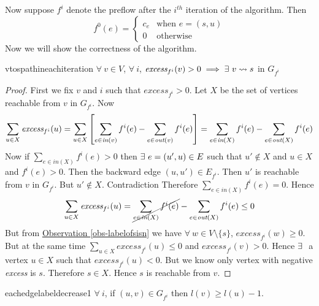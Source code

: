 Now suppose $f^i$ denote the preflow after the $i^{th}$ iteration of the algorithm. Then $$f^0(e)=\begin{cases}
	c_e&\text{when $e=(s,u)$}\\ 0 & \text{otherwise}
\end{cases}$$
Now we will show the correctness of the algorithm.
\begin{lemma}{}{vtospathineachiteration}
	$\forall\ v\in V$, $\forall\ i$, $\textit{excess}_{f^i}(v)>0\implies\exs\ v\rightsquigarrow s$ in $G_{f^i}$
\end{lemma}
\begin{proof}
	First we fix $v$ and $i$ such that $\textit{excess}_{f^i}>0$. Let $X$ be the set of vertices reachable from $v$ in $G_{f^i}$. Now 
	$$
		\sum_{u\in X}\textit{excess}_{f^i}(u) =\sum_{u\in X}\left[ \sum_{e\in \textit{in}(v)}f^i(e)-\sum_{e\in\textit{out}(v)}f^i(e) \right]= \sum_{e\in \textit{in}(X)}f^{i}(e)-\sum_{e\in\textit{out}{(X)}}f^{i}(e)$$
		Now if $\sum\limits_{e\in \textit{in}(X)}f^{i}(e)>0$ then $\exists\ e=(u',u)\in E$ such that $u'\notin X$ and $u\in X$ and $f^{i}(e)>0$. Then the backward edge $(u,u')\in E_{f^i}$. Then $u'$ is reachable from $v$ in $G_{f^i}$. But $u'\notin X$. Contradiction \ctr Therefore $\sum\limits_{e\in \textit{in}(X)}  f^{i}(e)=0$. Hence $$\sum_{u\in X}  \textit{excess}_{f^i}(u)= \cancel{\sum_{e\in \textit{in}(X)}f^{i}(e)}-\sum_{e\in\textit{out}{(X)}}f^{i}(e)\leq 0$$But from \hyperref[obs-labelofsisn]{Observation \ref{obs-labelofsisn}}  we have $\forall\ w\in V\setminus\{s\}$, $\textit{excess}_{f^i}(w)\geq 0$. But at the same time $\sum\limits_{u\in X}  \textit{excess}_{f^i}(u)\leq 0$ and $\textit{excess}_{f^i}(v)>0$. Hence $\exists\ $ a vertex $u\in X$ such that $\textit{excess}_{f^i}(u)< 0$. But we know only vertex with negative \textit{excess} is $s$. Therefore $s\in X$. Hence $s$ is reachable from $v$.
\end{proof}
\begin{lemma}{}{eachedgelabeldecrease1}
	$\forall\ i$, if $(u,v)\in G_{f^i}$ then $l(v)\geq l(u)-1$.	
\end{lemma}

